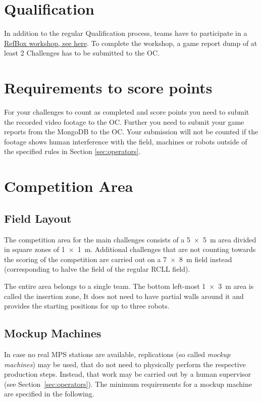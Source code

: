 \documentclass[12pt,twoside]{article}
\newcommand{\refsec}[1]{Section~\ref{#1}}
\begin{document}
\section{Qualification}
\label{sec:qualification}
In addition to the regular Qualification process, teams have to participate
in a \href{https://fh-aachen.sciebo.de/s/Qkm7VfIIEIIJk1d}{RefBox workshop, see here}.
To complete the workshop, a game report dump of at least 2 Challenges
 has to be submitted to the OC.

\section{Requirements to score points}
\label{sec:scoring}
For your challenges to count as completed and score points you need to submit
the recorded video footage to the OC.
Further you need to submit your game reports from the MongoDB to the OC.
Your submission will not be counted if the footage shows human
interference with the field, machines or robots outside of
the specified rules in Section \ref{sec:operators}.

\section{Competition Area}
\subsection{Field Layout}
The competition area for the main challenges consists of a \SI{5 x 5}{\metre}
area divided in square zones of \SI{1 x 1}{\metre}. Additional challenges that
are not counting towards the scoring of the competition are carried out on
a \SI{7 x 8}{\metre} field instead (corresponding to halve the field of the
regular \ac{RCLL} field).


The entire area belongs to a single team. The bottom left-most
\SI{1 x 3}{\metre} area is called the insertion zone, It does not need to have
partial walls around it and provides the starting positions for up to three
robots.

\subsection{Mockup Machines}\label{sec:machines}
In case no real \ac{MPS} stations are available, replications
(so called \emph{mockup machines}) may be used, that do not need to
physically perform the respective production steps. Instead, that work may
be carried out by a human supervisor (see \refsec{sec:operators}).
The minimum requirements for a mockup machine are specified in the following.
\end{document}
